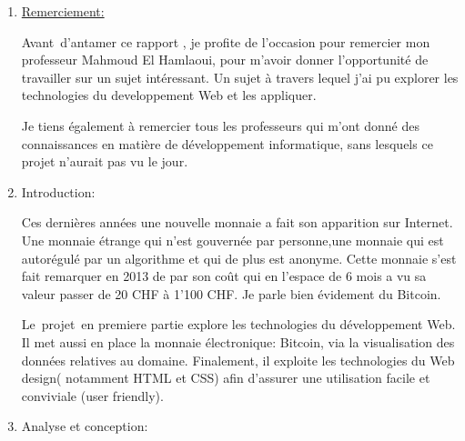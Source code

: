 \documentclass[12pt]{article}
\begin{document}
\vspace{\baselineskip}
\begin{enumerate}
	\item \uline{Remerciement:}\par


\vspace{\baselineskip}
{\fontsize{14pt}{16.8pt}\selectfont Avant\ d’antamer ce rapport , je profite de l’occasion pour remercier mon professeur Mahmoud El Hamlaoui, pour m’avoir donner l’opportunité de travailler sur un sujet intéressant. Un sujet à travers lequel j’ai pu  explorer les technologies du developpement Web et les appliquer. \par}\par

{\fontsize{14pt}{16.8pt}\selectfont Je tiens également à remercier tous les professeurs qui m’ont donné des connaissances en matière de développement informatique, sans lesquels ce projet n’aurait pas vu le jour.\par}\par


\newpage

\vspace{\baselineskip}
	\item Introduction:\par

{\fontsize{14pt}{16.8pt}\selectfont Ces dernières années une nouvelle monnaie a fait son apparition sur Internet. Une monnaie étrange qui n’est gouvernée par personne,une monnaie qui est autorégulé par un algorithme et qui de plus est anonyme. Cette monnaie s’est fait remarquer en 2013 de par son coût qui en l’espace de 6 mois a vu sa valeur passer de 20 CHF à 1’100 CHF. Je parle bien évidement du Bitcoin.\par}\par

{\fontsize{14pt}{16.8pt}\selectfont Le\ projet\ en premiere partie  explore les technologies du développement Web. Il met aussi en place la monnaie électronique: Bitcoin, via la visualisation des données relatives au domaine. Finalement, il exploite les technologies du Web design( notamment HTML et CSS) afin d’assurer  une utilisation facile et conviviale (user friendly).\par}\par


\newpage

\vspace{\baselineskip}
	\item Analyse et conception:\par


\end{enumerate}
\end{document}
